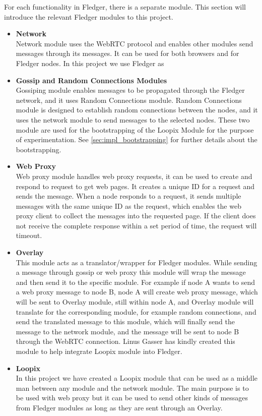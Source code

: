 \documentclass[a4paper,11pt,oneside]{report}
\begin{document}
For each functionality in Fledger, there is a separate module. This section will introduce the relevant Fledger modules to this project.

\begin{itemize}
    \item \textbf{Network}\\
    Network module uses the WebRTC protocol and enables other modules send messages through its messages. It can be used for both browsers and for Fledger nodes. In this project we use Fledger as 
    \item \textbf{Gossip and Random Connections Modules} \\
    Gossiping module enables messages to be propagated through the Fledger network, and it uses Random Connections module. Random Connections module is designed to establish random connections between the nodes, and it uses the network module to send messages to the selected nodes. These two module are used for the bootstrapping of the Loopix Module for the purpose of experimentation. See \autoref{sec:impl_bootstrapping} for further details about the bootstrapping.
    \item \textbf{Web Proxy}\\
    Web proxy module handles web proxy requests, it can be used to create and respond to request to get web pages. It creates a unique ID for a request and sends the message. When a node responds to a request, it sends multiple messages with the same unique ID as the request, which enables the web proxy client to collect the messages into the requested page. If the client does not receive the complete response within a set period of time, the request will timeout.
    \item \textbf{Overlay}\\
    This module acts as a translator/wrapper for Fledger modules. While sending a message through gossip or web proxy this module will wrap the message and then send it to the specific module. For example if node A wants to send a web proxy message to node B, node A will create web proxy message, which will be sent to Overlay module, still within node A, and Overlay module will translate for the corresponding module, for example random connections, and send the translated message to this module, which will finally send the message to the network module, and the message will be sent to node B through the WebRTC connection. Linus Gasser has kindly created this module to help integrate Loopix module into Fledger.
    \item \textbf{Loopix}\\
    In this project we have created a Loopix module that can be used as a middle man between any module and the network module. The main purpose is to be used with web proxy but it can be used to send other kinds of messages from Fledger modules as long as they are sent through an Overlay.
\end{itemize}
\end{document}
